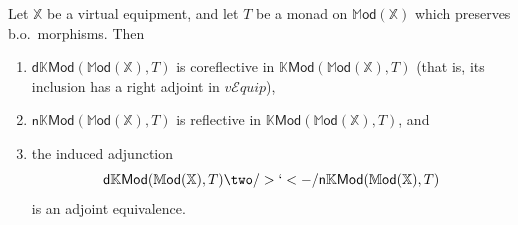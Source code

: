 \documentclass{tac}
\makeatletter
\newcommand{\Mod}{\ensuremath{\mathbb{M}\mathsf{od}}}
\newcommand{\KMod}{\mathbb{K}\mathsf{Mod}}
\newcommand{\nMod}{\mathsf{n}\mathbb{K}\mathsf{Mod}}
\newcommand{\dMod}{\mathsf{d}\mathbb{K}\mathsf{Mod}}
\newcommand{\vEquip}{\ensuremath{\mathit{v}\mathcal{E}\!\mathit{quip}}}
\numberwithin{equation}{section}
\def\currthmtype{}
\let\old@label\label
\def\label#1{%
    {\let\your@currentlabel\@currentlabel%
      \edef\@currentlabel{\currthmtype}%
      \old@label{label@name@#1}}%
    \old@label{#1}}
\makeatother
\begin{document}
\begin{theorem}\label{thm:norm-disc-eqv}
  Let $\mathbb{X}$ be a virtual equipment, and let $T$ be a monad on
  $\Mod(\mathbb{X})$ which preserves b.o.\ morphisms.  Then
  \begin{enumerate}
  \item $\dMod(\Mod(\mathbb{X}),T)$ is coreflective in
    $\KMod(\Mod(\mathbb{X}),T)$ (that
    is, its inclusion has a right adjoint in \vEquip),\label{item:nd1}
  \item $\nMod(\Mod(\mathbb{X}),T)$ is reflective in
    $\KMod(\Mod(\mathbb{X}),T)$, and\label{item:nd2}
  \item the induced adjunction
    \[\dMod(\Mod(\mathbb{X}),T)\two/>`<-/ \nMod(\Mod(\mathbb{X}),T)\]
    is an adjoint equivalence.\label{item:nd3}
  \end{enumerate}
\end{theorem}
\end{document}
